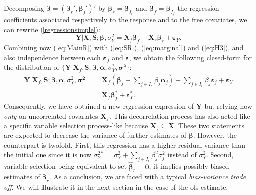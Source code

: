 \documentclass[11pt,a4paper]{article}
\begin{document}
Decomposing $\boldsymbol{\beta}=(\boldsymbol{\beta}_r',\boldsymbol{\beta}_f')'$ by $\boldsymbol{\beta}_r=\boldsymbol{\beta}_{J_r}$ and $\boldsymbol{\beta}_f=\boldsymbol{\beta}_{J_f}$ the regression coefficients associated respectively to the response and to the free covariates, we can rewrite (\ref{regressionsimple}):
\begin{equation}
			\boldsymbol{Y}{|\boldsymbol{X},\boldsymbol{S}};\boldsymbol{\beta},\sigma_Y^2=\boldsymbol{X}_f\boldsymbol{\beta}_f+\boldsymbol{X}_r\boldsymbol{\beta}_r+\boldsymbol{\varepsilon}_Y. \label{eq:MainR}
\end{equation}
Combining now (\ref{eq:MainR}) with (\ref{eq:SR}), (\ref{eq:marginal}) and (\ref{eq:H3}), and also independence between each $\boldsymbol{\varepsilon}_j$ and $\boldsymbol{\varepsilon}$, we obtain the following closed-form for the distribution of $\{\boldsymbol{Y} |\boldsymbol{X}_f,\boldsymbol{S};\boldsymbol{\beta},\boldsymbol{\alpha},\sigma_Y^2,\boldsymbol{\sigma^2}\}$:
\begin{eqnarray}
	\boldsymbol{Y}{|\boldsymbol{X}_f,\boldsymbol{S}};\boldsymbol{\beta},\boldsymbol{\alpha},\sigma_Y^2,\boldsymbol{\sigma^2}&=&\boldsymbol{X}_f (\boldsymbol{\beta}_f+ \sum_{j \in I_r}\beta_{j}\boldsymbol{\alpha}_j)+  \sum_{j \in I_r}\beta_{j}\boldsymbol{\varepsilon}_j+\boldsymbol{\varepsilon}_Y \label{eq:Trueexpl} \\
	&=&\boldsymbol{X}_f\boldsymbol{\beta}_f^*+\boldsymbol{\varepsilon}_Y^*.\label{eq:modexpl}
\end{eqnarray}
Consequently, we have obtained a new regression expression of $\boldsymbol{Y}$ but relying now {\it only} on uncorrelated covariates $\boldsymbol{X}_f$. This decorrelation process has also acted like a specific variable selection process-like because $\boldsymbol{X}_f \subseteq \boldsymbol{X}$. These two statements are expected to decrease the variance of further estimates of $\boldsymbol{\beta}$. However, the counterpart is twofold. First, this regression has a higher residual variance than the initial one since it is now $\sigma^{2*}_Y=\sigma^2_Y+\sum_{j \in I_r}\beta_{j}^2\sigma^2_j$ instead of $\sigma^2_Y$. Second, variable selection being equivalent to set $\hat{\boldsymbol{\beta}}_r=\boldsymbol{0}$, it implies possibly biased estimates of $\boldsymbol{\beta}_r$. As a conclusion, we are faced with a typical {\it bias-variance trade off}. We will illustrate it in the next section in the case of the {\sc ols} estimate.

\vspace{3mm}
\end{document}
